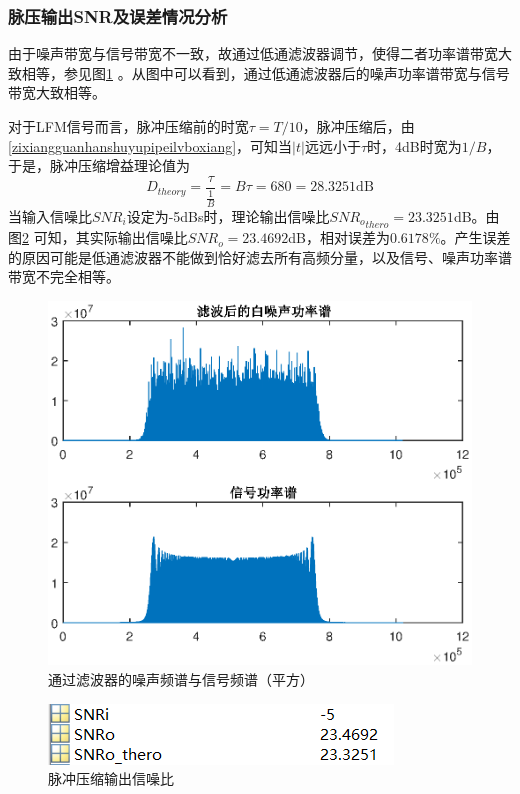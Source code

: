 \documentclass[12pt]{article}
\begin{document}
\subsubsection{脉压输出SNR及误差情况分析}
由于噪声带宽与信号带宽不一致，故通过低通滤波器调节，使得二者功率谱带宽大致相等，参见图\ref{tiaojiezhong}
。从图中可以看到，通过低通滤波器后的噪声功率谱带宽与信号带宽大致相等。\par
对于LFM信号而言，脉冲压缩前的时宽$\tau=T/10$，脉冲压缩后，由\ref{zixiangguanhanshuyupipeilvboxiang}，可知当$|t|$远远小于$\tau$时，4dB时宽为$1/B$，于是，脉冲压缩增益理论值为
\begin{equation}\label{zengyi1}
 D_{theory}=\frac{\tau}{\frac{1}{B}}=B\tau=680=28.3251\mbox{dB}
\end{equation}
当输入信噪比$SNR_i$设定为-5dBs时，理论输出信噪比${SNR_o}_{thero}=23.3251$dB。由图\ref{shuju_pipeilvbo}
可知，其实际输出信噪比$SNR_o=23.4692$dB，相对误差为$0.6178\%$。产生误差的原因可能是低通滤波器不能做到恰好滤去所有高频分量，以及信号、噪声功率谱带宽不完全相等。
\begin{figure}[htbp]
  \centering
  \includegraphics[width=\textwidth]{tiaojiezhong}
  \caption{通过滤波器的噪声频谱与信号频谱（平方）}\label{tiaojiezhong}
\end{figure}
\begin{figure}[htbp]
  \centering
  \includegraphics[width=.6\textwidth]{TIM20190623001728}
  \caption{脉冲压缩输出信噪比}\label{shuju_pipeilvbo}
\end{figure}
\end{document}

